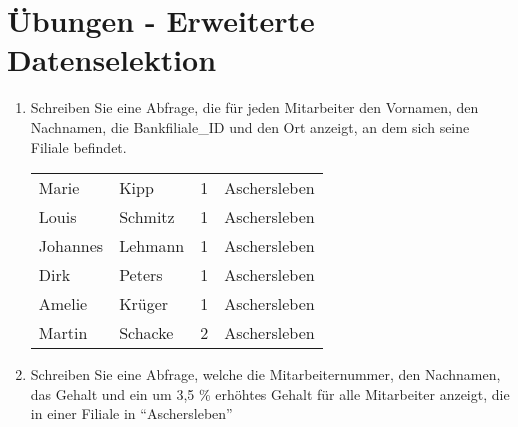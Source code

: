 \clearpage
    \section{\"Ubungen - Erweiterte Datenselektion}
      \begin{enumerate}
        \item Schreiben Sie eine Abfrage, die f\"ur jeden Mitarbeiter den
        Vornamen, den Nachnamen, die Bankfiliale\_ID und den Ort anzeigt, an dem
        sich seine Filiale befindet.
        \begin{center}
          \begin{small}
            \tablehead{}
            \begin{msoraclesql}
              \begin{supertabular}{llrl}
                Marie & Kipp & 1 & Aschersleben \\
                Louis & Schmitz & 1 & Aschersleben \\
                Johannes & Lehmann & 1 & Aschersleben \\
                Dirk & Peters & 1 & Aschersleben \\
                Amelie & Kr\"uger & 1 & Aschersleben \\
                Martin & Schacke & 2 & Aschersleben \\
              \end{supertabular}
            \end{msoraclesql}
          \end{small}
        \end{center}
        \item Schreiben Sie eine Abfrage, welche die Mitarbeiternummer, den
        Nachnamen, das Gehalt und ein um 3,5 \% erh\"ohtes Gehalt f\"ur alle
        Mitarbeiter anzeigt, die in einer Filiale in \enquote{Aschersleben}

\end{enumerate}
